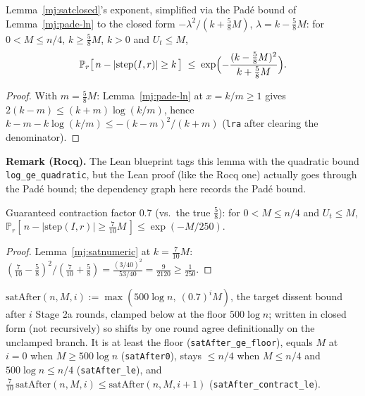 \begin{lemma}\label{mj:satnumeric}
  \rocqok
  Lemma~\ref{mj:satclosed}'s exponent, simplified via the Pad\'e bound
  of Lemma~\ref{mj:pade-ln} to the closed form
  $-\lambda^2/(k+\tfrac58M)$, $\lambda=k-\tfrac58M$: for $0 < M \le n/4$,
  $k \ge \tfrac58 M$, $k > 0$ and $U_t \le M$,
  \[
    \mathbb{P}_r\bigl[\, n - |\mathrm{step}(I,r)| \ge k \,\bigr]
    \;\le\; \exp\Bigl(-\frac{(k - \tfrac58 M)^2}{k + \tfrac58 M}\Bigr).
  \]
\end{lemma}
\begin{proof}
  \rocqok
  With $m = \tfrac58 M$: Lemma~\ref{mj:pade-ln} at $x = k/m \ge 1$ gives
  $2(k - m) \le (k + m)\log(k/m)$, hence
  $k - m - k\log(k/m) \le -(k-m)^2/(k+m)$ (\texttt{lra} after clearing the
  denominator).
\end{proof}

\noindent\textbf{Remark (Rocq).} The Lean blueprint tags this lemma with the
quadratic bound \texttt{log\_ge\_quadratic}, but the Lean proof (like the
Rocq one) actually goes through the Pad\'e bound; the dependency graph here
records the Pad\'e bound.

\begin{lemma}\label{mj:satcontract}
  \rocqok
  Guaranteed contraction factor $0.7$ (vs.\ the true $\tfrac58$): for
  $0 < M \le n/4$ and $U_t \le M$,
  $\mathbb{P}_r[\, n - |\mathrm{step}(I,r)| \ge \tfrac{7}{10} M \,] \le \exp(-M/250)$.
\end{lemma}
\begin{proof}
  \rocqok
  Lemma~\ref{mj:satnumeric} at $k = \tfrac7{10}M$:
  $(\tfrac{7}{10} - \tfrac58)^2 / (\tfrac7{10} + \tfrac58) = \tfrac{(3/40)^2}{53/40}
  = \tfrac{9}{2120} \ge \tfrac{1}{250}$.
\end{proof}

\begin{definition}\label{mj:satafter}
  \rocqok
  $\mathrm{satAfter}(n,M,i) := \max(500\log n,\ (0.7)^i M)$, the target
  dissent bound after $i$ Stage 2a rounds, clamped below at the floor
  $500\log n$; written in closed form (not recursively) so shifts by one
  round agree definitionally on the unclamped branch. It is at least the
  floor (\texttt{satAfter\_ge\_floor}), equals $M$ at $i = 0$ when
  $M \ge 500\log n$ (\texttt{satAfter0}), stays $\le n/4$ when
  $M \le n/4$ and $500\log n \le n/4$ (\texttt{satAfter\_le}), and
  $\tfrac{7}{10}\,\mathrm{satAfter}(n,M,i) \le \mathrm{satAfter}(n,M,i+1)$
  (\texttt{satAfter\_contract\_le}).
\end{definition}


